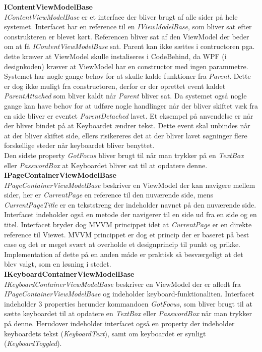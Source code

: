 \textbf{IContentViewModelBase}\\
\textit{IContentViewModelBase} er et interface der bliver brugt af alle sider på hele systemet. Interfacet har en reference til en \textit{IViewModelBase}, som bliver sat efter construkteren er blevet kørt. Referencen bliver sat af den ViewModel der beder om at få \textit{IContentViewModelBase} sat. Parent kan ikke sættes i contructoren pga. dette kræver at ViewModel skulle instaliseres i CodeBehind, da WPF (i designkoden) kræver at ViewModel har en constructor med ingen parammetre.\\

Systemet har nogle gange behov for at skulle kalde funktioner fra \textit{Parent}. Dette er dog ikke muligt fra constructoren, derfor er der oprettet event kaldet \textit{ParentAttached} som bliver kaldt når \textit{Parent} bliver sat. Da systemet også nogle gange kan have behov for at udføre nogle handlinger når der bliver skiftet væk fra en side bliver er eventet \textit{ParentDetached} lavet. Et eksempel på anvendelse er når der bliver bindet på at Keyboardet ændrer tekst. Dette event skal unbindes når at der bliver skiftet side, ellers risikereres det at der bliver lavet søgninger flere forskellige steder når keyboardet bliver benyttet.\\

Den sidste property \textit{GotFocus} bliver brugt til når man trykker på en \textit{TextBox} eller \textit{PasswordBox} at Keyboardet bliver sat til at opdatere denne.\\

\textbf{IPageContainerViewModelBase}\\
\textit{IPageContainerViewModelBase} beskriver en ViewModel der kan navigere mellem sider, her er \textit{CurrentPage} en reference til den nuværende side, mens \textit{CurrentPageTitle} er en tekststreng der indeholder navnet på den nuværende side.\\

Interfacet indeholder også en metode der navigerer til en side ud fra en side og en titel. Interfacet bryder dog MVVM princippet idet at \textit{CurrentPage} er en direkte reference til Viewet. MVVM princippet er dog et princip der er baseret på best case og det er meget svært at overholde et designprincip til punkt og prikke. Implementation af dette på en anden måde er praktisk så besværgeligt at det blev valgt, som en løsning i stedet.\\

\textbf{IKeyboardContainerViewModelBase}\\
\textit{IKeyboardContainerViewModelBase} beskriver en ViewModel der er afledt fra \textit{IPageContainerViewModelBase} og indeholder keyboard-funktionaliten. Interfacet indeholder 3 properties herunder kommandoen \textit{GotFocus}, som bliver brugt til at sætte keyboardet til at opdatere en \textit{TextBox} eller \textit{PasswordBox} når man trykker på denne. Herudover indeholder interfacet også en property der indeholder keyboardets tekst (\textit{KeyboardText}), samt om keyboardet er synligt (\textit{KeyboardToggled}).\\

